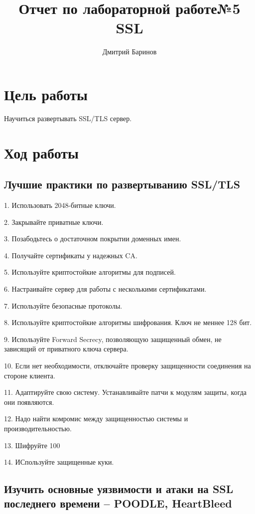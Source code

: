 \documentclass[10pt,a4paper]{article}
\author{Дмитрий Баринов}
\title{Отчет по лабораторной работе№5 SSL}
\begin{document}
\maketitle
\newpage

\section{Цель работы}

Научиться развертывать SSL/TLS сервер.

\section{Ход работы}

\subsection{Лучшие практики по развертыванию SSL/TLS}

1. Использовать 2048-битные ключи.

2. Закрывайте приватные ключи.

3. Позабодьтесь о достаточном покрытии доменных имен.

4. Получайте сертификаты у надежных CA.

5. Используйте криптостойкие алгоритмы для подписей.

6. Настраивайте сервер для работы с несколькими сертификатами.

7. Используйте безопасные протоколы.

8. Используйте криптостойкие алгоритмы шифрования. Ключ не меннее 128 бит.

9. Используйте Forward Secrecy, позволяющую защищенный обмен, не зависящий от приватного ключа сервера.

10. Если нет необходимости, отключайте проверку защищенности соединения на стороне клиента.

11. Адаптируйте свою систему. Устанавливайте патчи к модулям защиты, когда они появляются.

12. Надо найти комромис между защищенностью системы и производительностью.

13. Шифруйте 100%

14. ИСпользуйте защищенные куки.


\subsection{Изучить основные уязвимости и атаки на SSL последнего времени – POODLE, HeartBleed}
\end{document}
